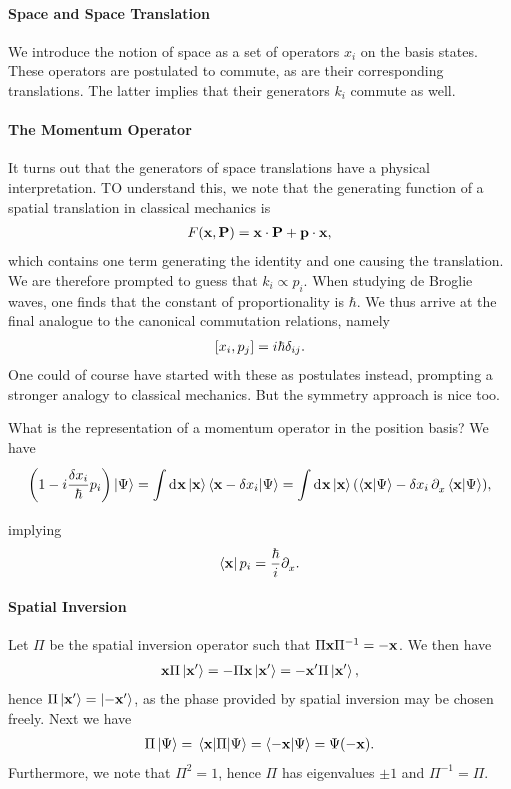 \paragraph{Space and Space Translation}
We introduce the notion of space as a set of operators $x_{i}$ on the basis states. These operators are postulated to commute, as are their corresponding translations. The latter implies that their generators $k_{i}$ commute as well.

\paragraph{The Momentum Operator}
It turns out that the generators of space translations have a physical interpretation. TO understand this, we note that the generating function of a spatial translation in classical mechanics is
\begin{align*}
	F(\vb{x}, \vb{P}) = \vb{x}\cdot\vb{P} + \vb{p}\cdot\vb{x},
\end{align*}
which contains one term generating the identity and one causing the translation. We are therefore prompted to guess that $k_{i} \propto p_{i}$. When studying de Broglie waves, one finds that the constant of proportionality is $\hbar$. We thus arrive at the final analogue to the canonical commutation relations, namely
\begin{align*}
	\comm{x_{i}}{p_{j}} = i\hbar\delta_{ij}.
\end{align*}
One could of course have started with these as postulates instead, prompting a stronger analogy to classical mechanics. But the symmetry approach is nice too.

What is the representation of a momentum operator in the position basis? We have
\begin{align*}
	\left(1 - i\frac{\var{x_{i}}}{\hbar}p_{i}\right)\ket{\Psi} = \int\limits_{}^{}\dd[]{\vb{x}}\ket{\vb{x}}\braket{\vb{x} - \var{x}_{i}}{\Psi} = \int\limits_{}^{}\dd[]{\vb{x}}\ket{\vb{x}}(\braket{\vb{x}}{\Psi} - \var{x}_{i}\partial_{x}^{}\braket{\vb{x}}{\Psi}),
\end{align*}
implying
\begin{align*}
	\bra{\vb{x}}p_{i} = \frac{\hbar}{i}\partial_{x}^{}.
\end{align*}

\paragraph{Spatial Inversion}
Let $\Pi$ be the spatial inversion operator such that $\Pi\vb{x}\Pi^{-1} = -\vb{x}$. We then have
\begin{align*}
	\vb{x}\Pi\ket{\vb{x}^{\prime}} = -\Pi\vb{x}\ket{\vb{x}^{\prime}} = -\vb{x}^{\prime}\Pi\ket{\vb{x}^{\prime}},
\end{align*}
hence $\Pi\ket{\vb{x}^{\prime}} = \ket{-\vb{x}^{\prime}}$, as the phase provided by spatial inversion may be chosen freely. Next we have
\begin{align*}
	\Pi\ket{\Psi} = \mel{\vb{x}}{\Pi}{\Psi} = \braket{-\vb{x}}{\Psi} = \Psi(-\vb{x}).
\end{align*}
Furthermore, we note that $\Pi^{2} = 1$, hence $\Pi$ has eigenvalues $\pm 1$ and $\Pi^{-1} = \Pi$.

